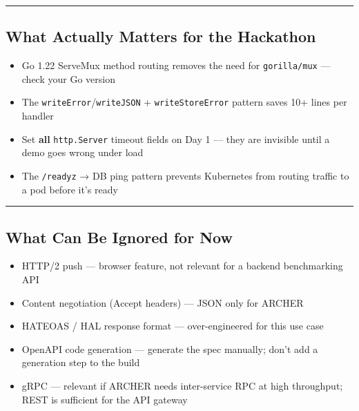 \documentclass[
]{article}
\providecommand{\tightlist}{%
  \setlength{\itemsep}{0pt}\setlength{\parskip}{0pt}}
\begin{document}
\begin{center}\rule{0.5\linewidth}{0.5pt}\end{center}

\hypertarget{what-actually-matters-for-the-hackathon}{%
\subsection{What Actually Matters for the
Hackathon}\label{what-actually-matters-for-the-hackathon}}

\begin{itemize}
\tightlist
\item
  Go 1.22 ServeMux method routing removes the need for
  \texttt{gorilla/mux} --- check your Go version
\item
  The \texttt{writeError}/\texttt{writeJSON} + \texttt{writeStoreError}
  pattern saves 10+ lines per handler
\item
  Set \textbf{all} \texttt{http.Server} timeout fields on Day 1 --- they
  are invisible until a demo goes wrong under load
\item
  The \texttt{/readyz} → DB ping pattern prevents Kubernetes from
  routing traffic to a pod before it's ready
\end{itemize}

\begin{center}\rule{0.5\linewidth}{0.5pt}\end{center}

\hypertarget{what-can-be-ignored-for-now}{%
\subsection{What Can Be Ignored for
Now}\label{what-can-be-ignored-for-now}}

\begin{itemize}
\tightlist
\item
  HTTP/2 push --- browser feature, not relevant for a backend
  benchmarking API
\item
  Content negotiation (Accept headers) --- JSON only for ARCHER
\item
  HATEOAS / HAL response format --- over-engineered for this use case
\item
  OpenAPI code generation --- generate the spec manually; don't add a
  generation step to the build
\item
  gRPC --- relevant if ARCHER needs inter-service RPC at high
  throughput; REST is sufficient for the API gateway
\end{itemize}
\end{document}
